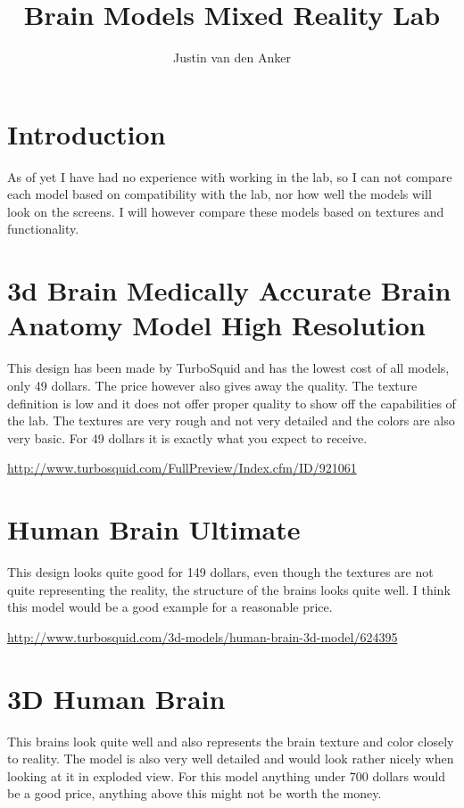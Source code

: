 \documentclass[10pt,a4paper]{article}
\author{Justin van den Anker}
\title{Brain Models Mixed Reality Lab}
\begin{document}
\maketitle

\section{Introduction}
As of yet I have had no experience with working in the lab, so I can not compare each model based on compatibility with the lab, nor how well the models will look on the screens. I will however compare these models based on textures and functionality.

\section{3d Brain Medically Accurate Brain Anatomy Model High Resolution}

This design has been made by TurboSquid and has the lowest cost of all models, only 49 dollars. The price however also gives away the quality. The texture definition is low and it does not offer proper quality to show off the capabilities of the lab. The textures are very rough and not very detailed and the colors are also very basic. For 49 dollars it is exactly what you expect to receive.

\url{http://www.turbosquid.com/FullPreview/Index.cfm/ID/921061}

\section{Human Brain Ultimate}
This design looks quite good for 149 dollars, even though the textures are not quite representing the reality, the structure of the brains looks quite well. I think this model would be a good example for a reasonable price.

\url{http://www.turbosquid.com/3d-models/human-brain-3d-model/624395}

\section{3D Human Brain}
This brains look quite well and also represents the brain texture and color closely to reality. The model is also very well detailed and would look rather nicely when looking at it in exploded view. For this model anything under 700 dollars would be a good price, anything above this might not be worth the money.
\end{document}
